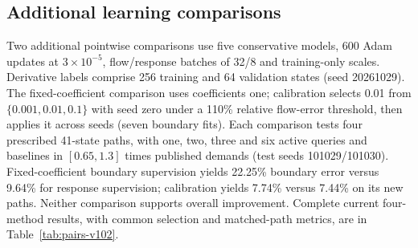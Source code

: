 \subsection{Additional learning comparisons}\label{app:legacy-learning}\label{app:learning-protocol}\label{app:calibration-protocol}
Two additional pointwise comparisons use five conservative models, 600 Adam updates at $3\times10^{-5}$, flow/response batches of 32/8 and training-only scales. Derivative labels comprise 256 training and 64 validation states (seed 20261029). The fixed-coefficient comparison uses coefficients one; calibration selects 0.01 from $\{0.001,0.01,0.1\}$ with seed zero under a 110\% relative flow-error threshold, then applies it across seeds (seven boundary fits). Each comparison tests four prescribed 41-state paths, with one, two, three and six active queries and baselines in $[0.65,1.3]$ times published demands (test seeds 101029/101030). Fixed-coefficient boundary supervision yields 22.25\% boundary error versus 9.64\% for response supervision; calibration yields 7.74\% versus 7.44\% on its new paths. Neither comparison supports overall improvement. Complete current four-method results, with common selection and matched-path metrics, are in Table~\ref{tab:pairs-v102}.

